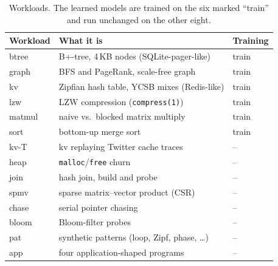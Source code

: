\documentclass{article}
\begin{document}
\begin{table}[h]
\caption{Workloads. The learned models are trained on the six marked ``train'' and run
unchanged on the other eight.}
\label{tab:workloads}
\vskip 0.05in
\begin{center}
\begin{footnotesize}
\setlength{\tabcolsep}{3pt}
\begin{tabular}{@{}l>{\raggedright\arraybackslash}p{1.95in}l@{}}
\toprule
Workload & What it is & Training \\
\midrule
btree  & B+-tree, 4\,KB nodes (SQLite-pager-like)                & train \\
graph  & BFS and PageRank, scale-free graph                       & train \\
kv     & Zipfian hash table, YCSB mixes (Redis-like)              & train \\
lzw    & LZW compression (\texttt{compress(1)})                   & train \\
matmul & naive vs.\ blocked matrix multiply                       & train \\
sort   & bottom-up merge sort                                     & train \\
\midrule
kv-T   & kv replaying Twitter cache traces                        & -- \\
heap   & \texttt{malloc}/\texttt{free} churn                      & -- \\
join   & hash join, build and probe                               & -- \\
spmv   & sparse matrix--vector product (CSR)                      & -- \\
chase  & serial pointer chasing                                   & -- \\
bloom  & Bloom-filter probes                                      & -- \\
pat    & 11 synthetic patterns (loop, Zipf, phase, \ldots)        & -- \\
app    & four application-shaped programs                         & -- \\
\bottomrule
\end{tabular}
\end{footnotesize}
\end{center}
\end{table}
\end{document}
